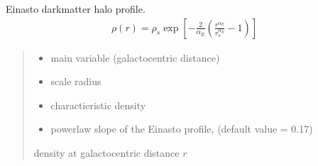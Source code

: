 \documentclass[letterpaper,10pt,english]{sphinxmanual}
\begin{document}
\begin{fulllineitems}
\label{\detokenize{diffsph.profiles:diffsph.profiles.templates.enst}}
\pysigstartsignatures
{}
\pysigstopsignatures
\sphinxAtStartPar
Einasto dark\sphinxhyphen{}matter halo profile.
\begin{equation*}
\begin{split}\rho(r) = \rho_s\exp\left[-\frac{2}{\alpha_E}\left(\frac{r^{\alpha_E}}{r_s^{\alpha_E}}-1\right)\right]\end{split}
\end{equation*}\begin{quote}\begin{description}
\begin{itemize}
\item {} 
\sphinxAtStartPar
{} \textendash{} main variable (galactocentric distance)

\item {} 
\sphinxAtStartPar
{} \textendash{} scale radius

\item {} 
\sphinxAtStartPar
{} \textendash{} charactieristic density

\item {} 
\sphinxAtStartPar
{} \textendash{} power\sphinxhyphen{}law slope of the Einasto profile, (default value = 0.17)

\end{itemize}

\sphinxAtStartPar
density at galactocentric distance \(r\)

\end{description}\end{quote}

\end{fulllineitems}

\end{document}
